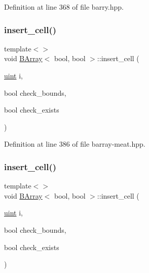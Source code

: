 Definition at line 368 of file barry.\+hpp.

\mbox{\label{class_b_array_a9a554db909a326d9110caa1d050f33e4}} 
\subsubsection{\texorpdfstring{insert\+\_\+cell()}{insert\_cell()}\hspace{0.1cm}{\footnotesize\ttfamily [9/10]}}
{\footnotesize\ttfamily template$<$$>$ \\
void \hyperlink{class_b_array}{B\+Array}$<$ bool, bool $>$\+::insert\+\_\+cell (\begin{DoxyParamCaption}\item[{\hyperlink{typedefs_8hpp_a91ad9478d81a7aaf2593e8d9c3d06a14}{uint}}]{i,  }\item[{bool}]{check\+\_\+bounds,  }\item[{bool}]{check\+\_\+exists }\end{DoxyParamCaption})\hspace{0.3cm}{\ttfamily [inline]}}



Definition at line 386 of file barray-\/meat.\+hpp.

\mbox{\label{class_b_array_a9a554db909a326d9110caa1d050f33e4}} 
\subsubsection{\texorpdfstring{insert\+\_\+cell()}{insert\_cell()}\hspace{0.1cm}{\footnotesize\ttfamily [10/10]}}
{\footnotesize\ttfamily template$<$$>$ \\
void \hyperlink{class_b_array}{B\+Array}$<$ bool, bool $>$\+::insert\+\_\+cell (\begin{DoxyParamCaption}\item[{\hyperlink{typedefs_8hpp_a91ad9478d81a7aaf2593e8d9c3d06a14}{uint}}]{i,  }\item[{bool}]{check\+\_\+bounds,  }\item[{bool}]{check\+\_\+exists }\end{DoxyParamCaption})\hspace{0.3cm}{\ttfamily [inline]}}



